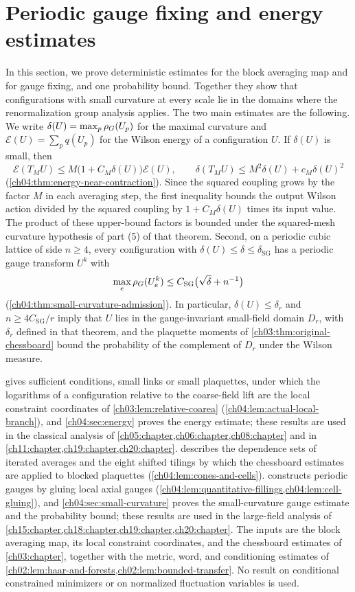 \chapter{Periodic gauge fixing and energy estimates}\label{ch04:chapter}

In this section, we prove deterministic estimates for the block averaging map and for gauge fixing, and one probability bound. Together they show that configurations with small curvature at every scale lie in the domains where the renormalization group analysis applies. The two main estimates are the following. We write $\delta(U)=\max_p\rho_G(U_p)$ for the maximal curvature and $\mathscr E(U)=\sum_pq(U_p)$ for the Wilson energy of a configuration $U$. If $\delta(U)$ is small, then
\[
 \mathscr E(T_MU)\le M\bigl(1+C_M\delta(U)\bigr)\mathscr E(U),\qquad \delta(T_MU)\le M^2\delta(U)+c_M\delta(U)^2
\]
(\cref{ch04:thm:energy-near-contraction}). Since the squared coupling grows by the factor $M$ in each averaging step, the first inequality bounds the output Wilson action divided by the squared coupling by $1+C_M\delta(U)$ times its input value. The product of these upper-bound factors is bounded under the squared-mesh curvature hypothesis of part (5) of that theorem. Second, on a periodic cubic lattice of side $n\ge4$, every configuration with $\delta(U)\le\delta\le\delta_{\mathrm{SG}}$ has a periodic gauge transform $U^k$ with
\[
 \max_e\rho_G(U^k_e)\le C_{\mathrm{SG}}\bigl(\sqrt\delta+n^{-1}\bigr)
\]
(\cref{ch04:thm:small-curvature-admission}). In particular, $\delta(U)\le\delta_r$ and $n\ge4C_{\mathrm{SG}}/r$ imply that $U$ lies in the gauge-invariant small-field domain $D_r$, with $\delta_r$ defined in that theorem, and the plaquette moments of \cref{ch03:thm:original-chessboard} bound the probability of the complement of $D_r$ under the Wilson measure.

 gives sufficient conditions, small links or small plaquettes, under which the logarithms of a configuration relative to the coarse-field lift are the local constraint coordinates of \cref{ch03:lem:relative-coarea} (\cref{ch04:lem:actual-local-branch}), and \cref{ch04:sec:energy} proves the energy estimate; these results are used in the classical analysis of \cref{ch05:chapter,ch06:chapter,ch08:chapter} and in \cref{ch11:chapter,ch19:chapter,ch20:chapter}.  describes the dependence sets of iterated averages and the eight shifted tilings by which the chessboard estimates are applied to blocked plaquettes (\cref{ch04:lem:cones-and-cells}).  constructs periodic gauges by gluing local axial gauges (\cref{ch04:lem:quantitative-fillings,ch04:lem:cell-gluing}), and \cref{ch04:sec:small-curvature} proves the small-curvature gauge estimate and the probability bound; these results are used in the large-field analysis of \cref{ch15:chapter,ch18:chapter,ch19:chapter,ch20:chapter}. The inputs are the block averaging map, its local constraint coordinates, and the chessboard estimates of \cref{ch03:chapter}, together with the metric, word, and conditioning estimates of \cref{ch02:lem:haar-and-forests,ch02:lem:bounded-transfer}. No result on conditional constrained minimizers or on normalized fluctuation variables is used.

